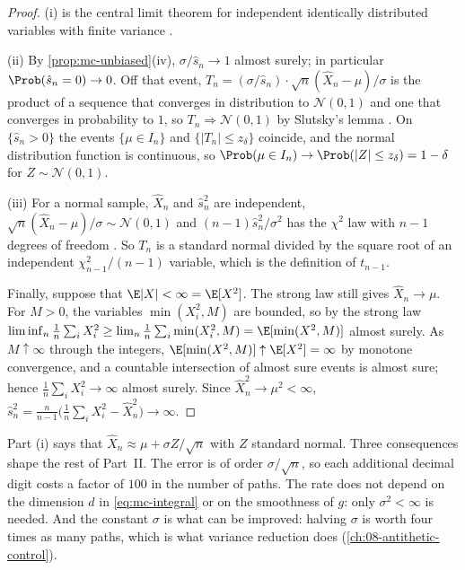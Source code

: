 \begin{proof}
(i) is the central limit theorem for independent identically distributed variables with
finite variance \citep[Section~3.4.1]{durrett}.

(ii) By \cref{prop:mc-unbiased}(iv), $\sigma/\hat s_n\to1$ almost surely; in particular
$\Prob(\hat s_n=0)\to0$. Off that event,
$T_n=(\sigma/\hat s_n)\cdot\sqrt n(\hat X_n-\mu)/\sigma$ is the product of a sequence that
converges in distribution to $\mathcal N(0,1)$ and one that converges in probability to $1$,
so $T_n\Rightarrow\mathcal N(0,1)$ by Slutsky's lemma \citep[Section~2.1, Lemma~2.8]{vandervaart-asymptotic}. On
$\{\hat s_n>0\}$ the events $\{\mu\in I_n\}$ and $\{|T_n|\le z_\delta\}$ coincide, and the
normal distribution function is continuous, so
$\Prob(\mu\in I_n)\to\Prob(|Z|\le z_\delta)=1-\delta$ for $Z\sim\mathcal N(0,1)$.

(iii) For a normal sample, $\hat X_n$ and $\hat s_n^2$ are independent,
$\sqrt n(\hat X_n-\mu)/\sigma\sim\mathcal N(0,1)$ and $(n-1)\hat s_n^2/\sigma^2$ has the
$\chi^2$ law with $n-1$ degrees of freedom \citep[Theorem~5.3.1]{casella-berger}. So $T_n$
is a standard normal divided by the square root of an independent $\chi^2_{n-1}/(n-1)$
variable, which is the definition of $t_{n-1}$.

Finally, suppose that $\E|X|<\infty=\E[X^2]$. The strong law still gives $\hat X_n\to\mu$. For $M>0$, the variables
$\min(X_i^2,M)$ are bounded, so by the strong law
$\liminf_n\frac1n\sum_iX_i^2\ge\lim_n\frac1n\sum_i\min(X_i^2,M)=\E[\min(X^2,M)]$ almost
surely. As $M\uparrow\infty$ through the integers, $\E[\min(X^2,M)]\uparrow\E[X^2]=\infty$ by
monotone convergence, and a countable intersection of almost sure events is almost sure;
hence $\frac1n\sum_iX_i^2\to\infty$ almost surely. Since $\hat X_n^2\to\mu^2<\infty$,
$\hat s_n^2=\frac{n}{n-1}\big(\frac1n\sum_iX_i^2-\hat X_n^2\big)\to\infty$.
\end{proof}

Part (i) says that $\hat X_n\approx\mu+\sigma Z/\sqrt n$ with $Z$ standard normal. Three
consequences shape the rest of Part~II. The error is of order $\sigma/\sqrt n$, so each
additional decimal digit costs a factor of $100$ in the number of paths. The rate does not
depend on the dimension $d$ in \eqref{eq:mc-integral} or on the smoothness of $g$: only
$\sigma^2<\infty$ is needed. And the constant $\sigma$ is what can be improved: halving
$\sigma$ is worth four times as many paths, which is what variance reduction does
(\cref{ch:08-antithetic-control}).

